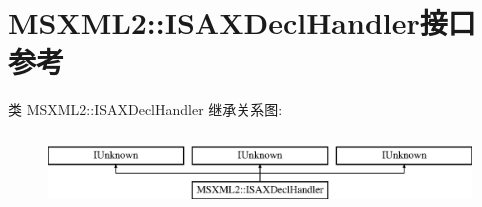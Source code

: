 \hypertarget{interface_m_s_x_m_l2_1_1_i_s_a_x_decl_handler}{}\section{M\+S\+X\+M\+L2\+:\+:I\+S\+A\+X\+Decl\+Handler接口 参考}
\label{interface_m_s_x_m_l2_1_1_i_s_a_x_decl_handler}
类 M\+S\+X\+M\+L2\+:\+:I\+S\+A\+X\+Decl\+Handler 继承关系图\+:\begin{figure}[H]
\begin{center}
\leavevmode
\includegraphics[height=2.000000cm]{interface_m_s_x_m_l2_1_1_i_s_a_x_decl_handler}
\end{center}
\end{figure}
